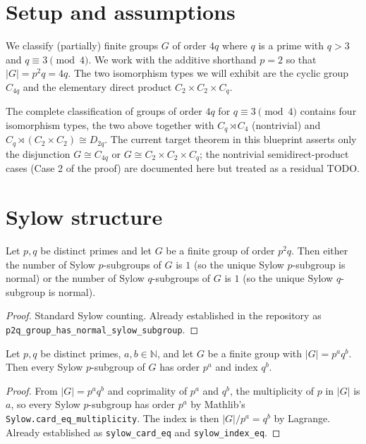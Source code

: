 


\section{Setup and assumptions}

We classify (partially) finite groups $G$ of order $4q$ where $q$ is a prime with
$q > 3$ and $q \equiv 3 \pmod 4$. We work with the additive shorthand $p = 2$ so
that $|G| = p^2 q = 4q$. The two isomorphism types we will exhibit are the
cyclic group $C_{4q}$ and the elementary direct product
$C_2 \times C_2 \times C_q$.

\begin{remark}
    The complete classification of groups of order $4q$ for $q \equiv 3
    \pmod 4$ contains four isomorphism types, the two above together with
    $C_q \rtimes C_4$ (nontrivial) and $C_q \rtimes (C_2 \times C_2) \cong
    D_{2q}$. The current target theorem in this blueprint asserts only the
    disjunction $G \cong C_{4q}$ or $G \cong C_2 \times C_2 \times C_q$; the
    nontrivial semidirect-product cases (Case 2 of the proof) are documented
    here but treated as a residual TODO.
\end{remark}

\section{Sylow structure}

\begin{lemma}
    \label{lem:p2q-normal-sylow}
    Let $p, q$ be distinct primes and let $G$ be a finite group of order
    $p^2 q$. Then either the number of Sylow $p$-subgroups of $G$ is $1$ (so
    the unique Sylow $p$-subgroup is normal) or the number of Sylow
    $q$-subgroups of $G$ is $1$ (so the unique Sylow $q$-subgroup is normal).
\end{lemma}
\begin{proof}
    Standard Sylow counting. Already established in the repository as
    \texttt{p2q\_group\_has\_normal\_sylow\_subgroup}.
\end{proof}

\begin{lemma}
    \label{lem:sylow-card-index}
    Let $p, q$ be distinct primes, $a, b \in \mathbb{N}$, and let $G$ be a
    finite group with $|G| = p^a q^b$. Then every Sylow $p$-subgroup of $G$
    has order $p^a$ and index $q^b$.
\end{lemma}
\begin{proof}
    From $|G| = p^a q^b$ and coprimality of $p^a$ and $q^b$, the multiplicity
    of $p$ in $|G|$ is $a$, so every Sylow $p$-subgroup has order $p^a$ by
    Mathlib's \texttt{Sylow.card\_eq\_multiplicity}. The index is then
    $|G|/p^a = q^b$ by Lagrange. Already established as
    \texttt{sylow\_card\_eq} and \texttt{sylow\_index\_eq}.
\end{proof}

